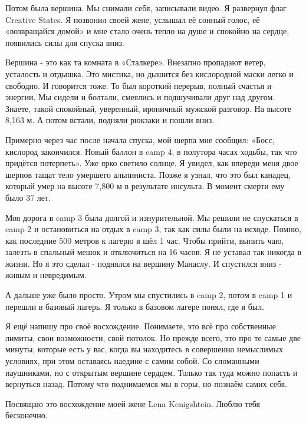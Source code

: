 Потом была вершина. Мы снимали себя, записывали видео. Я развернул флаг
Creative States. Я позвонил своей жене, услышал её сонный голос, её
«возвращайся домой» и мне стало очень тепло на душе и спокойно на сердце,
появились силы для спуска вниз. 

Вершина - это как та комната в «Сталкере». Внезапно пропадают ветер, усталость
и отдышка. Это мистика, но дышится без кислородной маски легко и свободно. И
говорится тоже. То был короткий перерыв, полный счастья и энергии. Мы сидели и
болтали, смеялись и подшучивали друг над другом. Знаете, такой спокойный,
уверенный, ироничный мужской разговор. На высоте 8,163 м. А потом встали,
подняли рюкзаки и пошли вниз. 

Примерно через час после начала спуска, мой шерпа мне сообщил: «Босс, кислород
закончился. Новый баллон в camp 4, в полутора часах ходьбы, так что придётся
потерпеть». Уже ярко светило солнце. Я увидел, как впереди меня двое шерпов
тащат тело умершего альпиниста. Позже я узнал, что это был канадец, который
умер на высоте 7,800 м в результате инсульта. В момент смерти ему было 37 лет. 

Моя дорога в camp 3 была долгой и изнурительной. Мы решили не спускаться в camp
2 и остановиться на отдых в camp 3, так как силы были на исходе. Помню, как
последние 500 метров к лагерю я шёл 1 час. Чтобы прийти, выпить чаю, залезть в
спальный мешок и отключиться на 16 часов. Я не уставал так никогда в жизни. Но
я это сделал - поднялся на вершину Манаслу. И спустился вниз - живым и
невредимым. 

А дальше уже было просто. Утром мы спустились в camp 2, потом в camp 1 и
перешли в базовый лагерь. Я только в базовом лагере понял, где я был. 

Я ещё напишу про своё восхождение. Понимаете, это всё про собственные лимиты,
свои возможности, свой потолок. Но прежде всего, это про те самые две минуты,
которые есть у вас, когда вы находитесь в совершенно немыслимых условиях, при
этом оставаясь наедине с самим собой. Со сломанными наушниками, но с открытым
вершине сердцем. Только так туда можно попасть и вернуться назад. Потому что
поднимаемся мы в горы, но познаём самих себя. 

Посвящаю это восхождение моей жене Lena Kenigshtein. Люблю тебя бесконечно.

